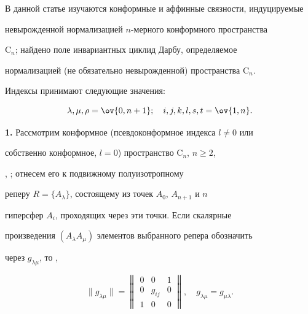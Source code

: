 

\pagestyle{plain} %


 




\maketitle 


\label{begin} 


 


 


В данной статье изучаются конформные и аффинные связности, индуцируемые 


невырожденной нормализацией $n$-мерного конформного пространства 


$\mathrm C_n$; найдено поле инвариантных циклид Дарбу, определяемое 


нормализацией (не обязательно невырожденной) пространства $\mathrm 


C_n$. 


 


Индексы принимают следующие значения: 


$$ 


\lambda,\mu,\rho=\ov{0,n+1};\quad 


i,j,k,l,s,t=\ov{1,n}. 


$$ 


 


{\bf 1.} Рассмотрим конформное (псевдоконформное индекса $l\ne0$ или 


собственно конформное, $l=0$) пространство $\mathrm C_n$, $n\ge2$, 


\cite{1}, \cite{2}; отнесем его к подвижному полуизотропному \cite{3} 


реперу $R=\{A_\lambda\}$, состоящему из точек $A_0$, $A_{n+1}$ и $n$ 


гиперсфер $A_i$, проходящих через эти точки. Если скалярные 


произведения $(A_\lambda A_\mu)$ элементов выбранного репера обозначить 


через $g_{\lambda\mu}$, то \cite{1}, \cite{2} 


\begin{equation} 


\|g_{\lambda\mu}\|= 


\begin{Vmatrix} 


0 & 0 & 1 \\ 0 & g_{i j} & 0 \\ 1 & 0 & 0 


\end{Vmatrix} 


,\quad g_{\lambda\mu}=g_{\mu\lambda}. 


\end{equation} 


